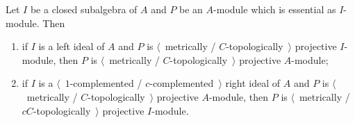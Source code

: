 \begin{proposition}\label{MetTopProjUnderChangeOfAlg} Let $I$ be a closed
subalgebra of $A$ and $P$ be an $A$-module which is essential as $I$-module.
Then

\begin{enumerate}[label = (\roman*)]
    \item if $I$ is a left ideal of $A$ and $P$ is $\langle$~metrically /
    $C$-topologically~$\rangle$  projective $I$-module, then $P$ is
    $\langle$~metrically / $C$-topologically~$\rangle$ projective $A$-module;

    \item if $I$ is a $\langle$~$1$-complemented / $c$-complemented~$\rangle$
    right ideal of $A$ and $P$ is $\langle$~metrically /
    $C$-topologically~$\rangle$ projective $A$-module, then $P$ is
    $\langle$~metrically / $cC$-topologically~$\rangle$ projective $I$-module.
\end{enumerate}
\end{proposition}
